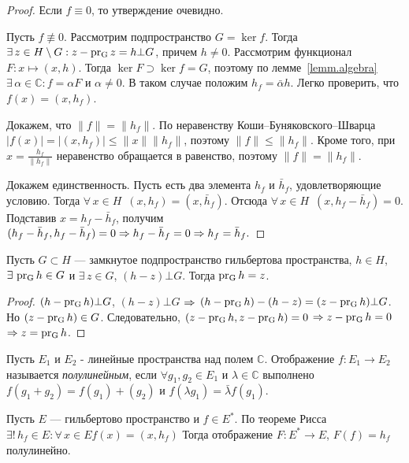 \documentclass[10pt,titlepage, a4paper]{article}
\begin{document}
\begin{proof}
Если $f\equiv0$, то утверждение очевидно.

Пусть $f\not\equiv 0$. Рассмотрим подпространство $G=\ker f$. Тогда
$\exists\,z\p\in H\setminus G:z-\pr{G}z=h\bot G$, причем $h\neq 0$.
Рассмотрим функционал $F\colon x\mapsto (x,h)$. Тогда $\ker F\supset
\ker f=G$, поэтому по лемме~\ref{lemm.algebra}
$\exists\,\alpha\in\mathbb{C}: f=\alpha F$ и $\alpha\neq 0$. В таком
случае положим $h_f=\bar{\alpha}h$. Легко проверить, что
$f(x)=(x,h_f)$.

Докажем, что $\|f\|=\|h_f\|$. По неравенству
Коши--Буняковского--Шва\-рца
$|f(x)|=|(x,h_f)|\leqslant\|x\|\|h_f\|$, поэтому
$\|f\|\leqslant\|h_f\|$. Кроме того, при $x=\frac{h_f}{\|h_f\|}$
неравенство обращается в равенство, поэтому $\|f\|=\|h_f\|$.

Докажем единственность. Пусть есть два элемента $h_f$ и $\bar{h}_f$,
удовлетворяющие условию. Тогда $\forall\,x\in H$\
$(x,h_f)=(x,\bar{h}_f)$. Отсюда $\forall\,x\in H$\
$(x,h_f-\bar{h}_f)=0$. Подставив $x=h_f-\bar{h}_f$, получим
$(h_f-\bar{h}_f,h_f-\bar{h}_f)=0\p\Rightarrow
h_f-\bar{h}_f=0\Rightarrow h_f=\bar{h}_f.$
\end{proof}

\lecture

\begin{theorem}
Пусть $G\subset H$ --- замкнутое подпространство гильбертова
пространства, $h\in H$, $\exists\, \mathop{\mathrm{pr_{G}}}h\in G $ и $\exists\,z\in
G$, $(h-z)\bot G$. Тогда $\mathop{\mathrm{pr_{G}}}h=z$.
\end{theorem}

\begin{proof}
$(h-\mathop{\mathrm{pr_{G}}}h)\bot G$, $(h-z)\bot G$ $\p\Rightarrow$
$(h-\pr{G}h)-(h-z)=(z\p-\pr{G}h)\bot G$. Но $(z-\mathop{\mathrm{pr_{G}}}h)\in G$.
Следовательно, $(z-\mathop{\mathrm{pr_{G}}}h,z-\mathop{\mathrm{pr_{G}}}h)=0\;$$ \p\Rightarrow
z-\pr{G}h=0\;$$\Rightarrow z=\mathop{\mathrm{pr_{G}}}h$.
\end{proof}

\begin{defen}
Пусть $E_1$ и $E_2$ - линейные пространства над полем $\mathbb{C}$.
Отображение $f:E_1\rightarrow E_2$ называется \emph{полулинейным},
если $\forall g_1, g_2\in E_1$ и $\lambda \in \mathbb{C}$ выполнено
$f(g_1+g_2)=f(g_1)+(g_2)$ и $f(\lambda g_1)=\bar{\lambda} f(g_1)$.
\end{defen}

\begin{zam}
Пусть $E$ --- гильбертово пространство и $f\in E^*$. По теореме
Рисса  $\exists!\,h_f\in E:\forall\,x\in E$\;\;$f(x)=(x,h_f)$ Тогда
отображение $F\colon E^*\rightarrow E$, $F(f)=h_f$ полулинейно.
\end{zam}
\end{document}
